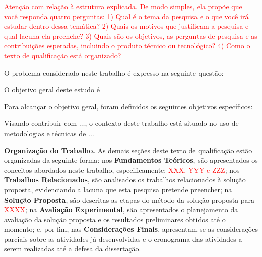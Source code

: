 \textcolor{red}{Atenção com relação à estrutura explicada. De modo simples, ela propõe que você responda quatro perguntas: 1) Qual é o tema da pesquisa e o que você irá estudar dentro dessa temática? 2) Quais os motivos que justificam a pesquisa e qual lacuna ela preenche? 3) Quais são os objetivos, as perguntas de pesquisa e as contribuições esperadas, incluindo o produto técnico ou tecnológico? 4) Como o texto de qualificação está organizado?}


O problema considerado neste trabalho é expresso na seguinte questão:


O objetivo geral deste estudo é

Para alcançar o objetivo geral, foram definidos os seguintes objetivos específicos:

Visando contribuir com $\dots$, o contexto deste trabalho
está situado no uso de metodologias e técnicas de $\dots$

\textbf{Organização do Trabalho.} As demais seções deste texto de qualificação estão organizadas da seguinte forma:
%
nos \textbf{Fundamentos Teóricos}, são apresentados os conceitos abordados neste trabalho, especificamente: \textcolor{red}{XXX, YYY e ZZZ};
%
nos \textbf{Trabalhos Relacionados}, são analisados os trabalhos relacionados à solução proposta, evidenciando a lacuna que esta pesquisa pretende preencher;
%
na \textbf{Solução Proposta}, são descritas as etapas do método da solução proposta para \textcolor{red}{XXXX};
%
na \textbf{Avaliação Experimental}, são apresentados o planejamento da avaliação da solução proposta e os resultados preliminares obtidos até o momento;
%
e, por fim, nas \textbf{Considerações Finais}, apresentam-se as considerações parciais sobre as atividades já desenvolvidas e o cronograma das atividades a serem realizadas até a defesa da dissertação.

